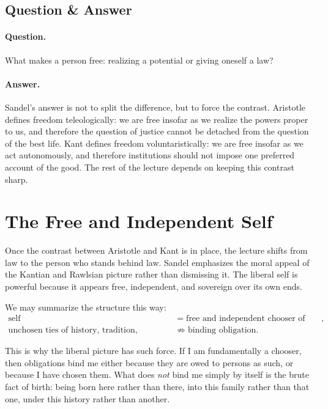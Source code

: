 \subsection{Question \& Answer}

\paragraph{Question.} What makes a person free: realizing a potential or giving oneself a law?

\paragraph{Answer.} Sandel's answer is not to split the difference, but to force the contrast. Aristotle defines freedom teleologically: we are free insofar as we realize the powers proper to us, and therefore the question of justice cannot be detached from the question of the best life. Kant defines freedom voluntaristically: we are free insofar as we act autonomously, and therefore institutions should not impose one preferred account of the good. The rest of the lecture depends on keeping this contrast sharp.

\section{The Free and Independent Self}

Once the contrast between Aristotle and Kant is in place, the lecture shifts from law to the person who stands behind law. Sandel emphasizes the moral appeal of the Kantian and Rawlsian picture rather than dismissing it. The liberal self is powerful because it appears free, independent, and sovereign over its own ends.

We may summarize the structure this way:
\begin{align}
\text{self} &= \text{free and independent chooser of ends}, \\
\text{unchosen ties of history, tradition, inherited status} &\not\Longrightarrow \text{binding obligation}.
\end{align}

This is why the liberal picture has such force. If I am fundamentally a chooser, then obligations bind me either because they are owed to persons as such, or because I have chosen them. What does \emph{not} bind me simply by itself is the brute fact of birth: being born here rather than there, into this family rather than that one, under this history rather than another.

